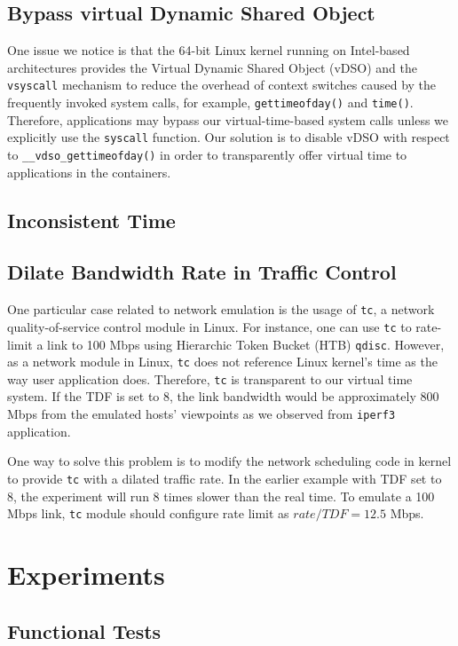 \documentclass{acm_proc_article-sp}
\begin{document}
\subsection{Bypass virtual Dynamic Shared Object}
One issue we notice is that the 64-bit Linux kernel running on Intel-based architectures provides the Virtual Dynamic Shared Object (vDSO) and the \texttt{vsyscall} mechanism to reduce the overhead of context switches caused by the frequently invoked system calls, for example, \texttt{gettimeofday()} and \texttt{time()}\cite{lwn:vdso}. Therefore, applications may bypass our virtual-time-based system calls unless we explicitly use the \texttt{syscall} function. Our solution is to disable vDSO with respect to \texttt{\_\_vdso\_gettimeofday()} in order to transparently offer virtual time to applications in the containers.

\subsection{Inconsistent Time}


\subsection{Dilate Bandwidth Rate in Traffic Control}
One particular case related to network emulation is the usage of \texttt{tc}, a network quality-of-service control module in Linux\cite{trafficcontrol}. 
For instance, one can use \texttt{tc} to rate-limit a link to 100 Mbps using Hierarchic Token Bucket (HTB) \texttt{qdisc}. 
However, as a network module in Linux, \texttt{tc} does not reference Linux kernel's time as the way user application does. 
Therefore, \texttt{tc} is transparent to our virtual time system. 
If the TDF is set to 8, the link bandwidth would be approximately 800 Mbps from the emulated hosts' viewpoints as we observed from \texttt{iperf3} application.

One way to solve this problem is to modify the network scheduling code in kernel to provide \texttt{tc} with a dilated traffic rate. 
In the earlier example with TDF set to 8, the experiment will run 8 times slower than the real time. To emulate a 100 Mbps link, \texttt{tc} module should configure rate limit as $rate/TDF=12.5$ Mbps. 

\section{Experiments}
\subsection{Functional Tests}
\end{document}
